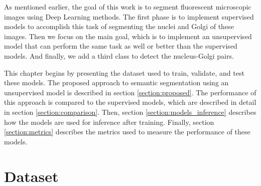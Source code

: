 \cleardoublepage
\label{chapter:methodology}


As mentioned earlier, the goal of this work is to segment fluorescent microscopic images using Deep Learning methods. The first phase is to implement supervised models to accomplish this task of segmenting the nuclei and Golgi of these images. Then we focus on the main goal, which is to implement an unsupervised model that can perform the same task as well or better than the supervised models. And finally, we add a third class to detect the nucleus-Golgi pairs.

This chapter begins by presenting the dataset used to train, validate, and test these models. The proposed approach to semantic segmentation using an unsupervised model is described in section \ref{section:proposed}. The performance of this approach is compared to the supervised models, which are described in detail in section \ref{section:comparison}. Then, section \ref{section:models_inference} describes how the models are used for inference after training. Finally, section \ref{section:metrics} describes the metrics used to measure the performance of these models.


\section{Dataset}
\label{section:dataset}

